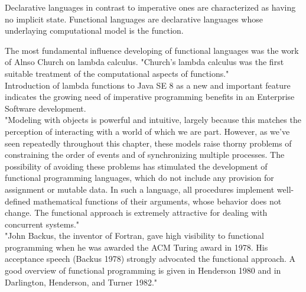 Declarative languages in contrast to imperative ones  are characterized as having no implicit state. Functional languages are declarative languages whose underlaying computational model is the function.\cite{Hudak}

The most fundamental influence developing of functional languages was the work of Alnso Church on lambda calculus. "Church’s lambda calculus was the first suitable treatment of the computational aspects of functions."\cite{Hudak}\\

Introduction of lambda functions to Java SE 8 as a new and important feature\cite{javase} indicates the growing need of imperative programming benefits in an Enterprise Software development.\\

"Modeling with objects is powerful and intuitive, largely because this matches the perception of interacting with a world of which we are part. However, as we've seen repeatedly throughout this chapter, these models raise thorny problems of constraining the order of events and of synchronizing multiple processes. The possibility of avoiding these problems has stimulated the development of functional programming languages, which do not include any provision for assignment or mutable data. In such a language, all procedures implement well-defined mathematical functions of their arguments, whose behavior does not change. The functional approach is extremely attractive for dealing with concurrent systems." \cite{sicp}\\

"John Backus, the inventor of Fortran, gave high visibility to functional programming when he was awarded the ACM Turing award in 1978. His acceptance speech (Backus 1978) strongly advocated the functional approach. A good overview of functional programming is given in Henderson 1980 and in Darlington, Henderson, and Turner 1982."\cite{sicp}\\
